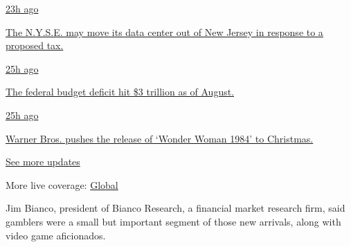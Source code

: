 \href{https://www.nytimes3xbfgragh.onion/live/2020/09/11/business/stock-market-today-coronavirus?action=click\&pgtype=Article\&state=default\&region=MAIN_CONTENT_1\&context=storylines_live_updates\#the-nyse-may-move-its-data-center-out-of-new-jersey-in-response-to-a-proposed-tax}{23h
ago}

\href{https://www.nytimes3xbfgragh.onion/live/2020/09/11/business/stock-market-today-coronavirus?action=click\&pgtype=Article\&state=default\&region=MAIN_CONTENT_1\&context=storylines_live_updates\#the-nyse-may-move-its-data-center-out-of-new-jersey-in-response-to-a-proposed-tax}{The
N.Y.S.E. may move its data center out of New Jersey in response to a
proposed tax.}

\href{https://www.nytimes3xbfgragh.onion/live/2020/09/11/business/stock-market-today-coronavirus?action=click\&pgtype=Article\&state=default\&region=MAIN_CONTENT_1\&context=storylines_live_updates\#the-federal-budget-deficit-hit-3-trillion-as-of-august}{25h
ago}

\href{https://www.nytimes3xbfgragh.onion/live/2020/09/11/business/stock-market-today-coronavirus?action=click\&pgtype=Article\&state=default\&region=MAIN_CONTENT_1\&context=storylines_live_updates\#the-federal-budget-deficit-hit-3-trillion-as-of-august}{The
federal budget deficit hit \$3 trillion as of August.}

\href{https://www.nytimes3xbfgragh.onion/live/2020/09/11/business/stock-market-today-coronavirus?action=click\&pgtype=Article\&state=default\&region=MAIN_CONTENT_1\&context=storylines_live_updates\#warner-bros-pushes-the-release-of-wonder-woman-1984-to-christmas}{25h
ago}

\href{https://www.nytimes3xbfgragh.onion/live/2020/09/11/business/stock-market-today-coronavirus?action=click\&pgtype=Article\&state=default\&region=MAIN_CONTENT_1\&context=storylines_live_updates\#warner-bros-pushes-the-release-of-wonder-woman-1984-to-christmas}{Warner
Bros. pushes the release of `Wonder Woman 1984' to Christmas.}

\href{https://www.nytimes3xbfgragh.onion/live/2020/09/11/business/stock-market-today-coronavirus?action=click\&pgtype=Article\&state=default\&region=MAIN_CONTENT_1\&context=storylines_live_updates}{See
more updates}

More live coverage:
\href{https://www.nytimes3xbfgragh.onion/2020/09/11/world/covid-19-coronavirus.html?action=click\&pgtype=Article\&state=default\&region=MAIN_CONTENT_1\&context=storylines_live_updates}{Global}

Jim Bianco, president of Bianco Research, a financial market research
firm, said gamblers were a small but important segment of those new
arrivals, along with video game aficionados.

